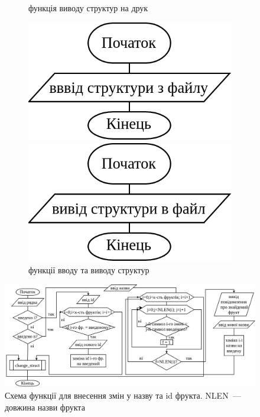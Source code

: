 \documentclass[12pt]{extreport}
\begin{document}
\begin{figure}[h]
\begin{subfigure}[b]{.28\textwidth}
		\caption{функція виводу структур на друк}
	\end{subfigure}
	\hfill
	\begin{subfigure}[b]{.23\textwidth}
	\centering
		\includegraphics[width=\textwidth]{fch2/read_struct.png}

		\medskip
		\includegraphics[width=\textwidth]{fch2/rstruct.png}
		\caption{функції вводу та виводу структур}
	\end{subfigure}
	\caption{}
\end{figure}

\begin{figure}[h]
	\centering
	\includegraphics[width=\textwidth]{fch2/change.png}
	\caption{Схема функції для внесення змін у назву та id фрукта. NLEN~--- довжина назви фрукта}
	\label{task2}
\end{figure}
\end{document}
